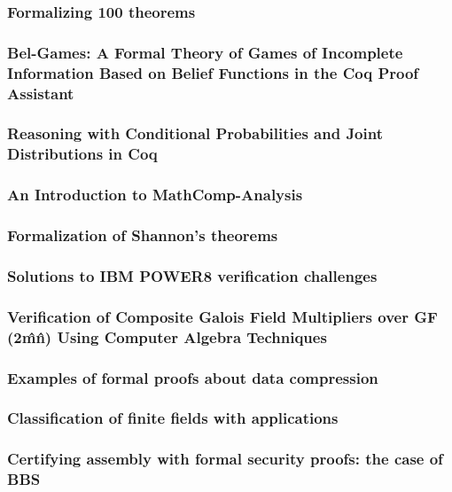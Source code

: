 \documentclass{article}
\begin{document}
\subsubsection{Formalizing 100 theorems}

\subsubsection{Bel-Games: A Formal Theory of Games of Incomplete Information Based on Belief Functions in the Coq Proof Assistant}

\subsubsection{Reasoning with Conditional Probabilities and Joint Distributions in Coq}

\subsubsection{An Introduction to MathComp-Analysis}

\subsubsection{Formalization of Shannon’s theorems}

\subsubsection{Solutions to IBM POWER8 verification challenges}

\subsubsection{Verification of Composite Galois Field Multipliers over GF (2\^m\^n) Using Computer Algebra Techniques}

\subsubsection{Examples of formal proofs about data compression}

\subsubsection{Classification of finite fields with applications}

\subsubsection{Certifying assembly with formal security proofs: the case of BBS}
\end{document}

